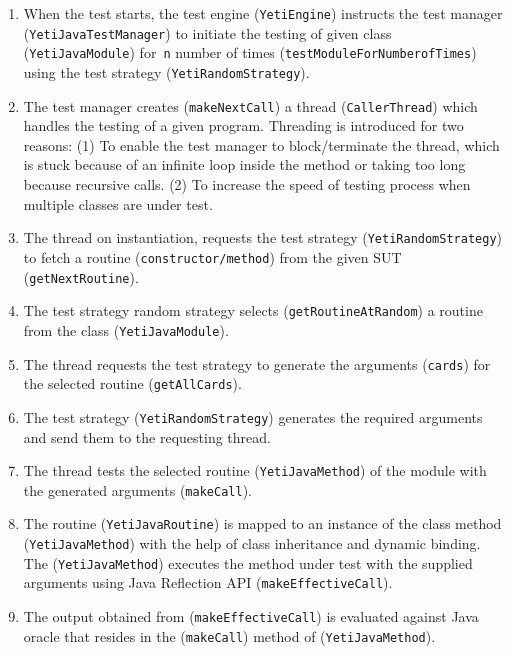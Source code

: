 \begin{enumerate}
\item When the test starts, the test engine (\verb+YetiEngine+) instructs the test manager (\verb+YetiJavaTestManager+) to initiate the testing of given class (\verb+YetiJavaModule+) for~\verb+n+ number of times (\verb+testModuleForNumberofTimes+) using the test strategy (\verb+YetiRandomStrategy+).

\item The test manager creates (\verb+makeNextCall+) a thread (\verb+CallerThread+) which handles the testing of a given program. Threading is introduced for two reasons: (1) To enable the test manager to block/terminate the thread, which is stuck because of an infinite loop inside the method or taking too long because recursive calls. (2) To increase the speed of testing process when multiple classes are under test.

\item The thread on instantiation, requests the test strategy (\verb+YetiRandomStrategy+) to fetch a routine (\verb+constructor/method+) from the given SUT (\verb+getNextRoutine+).

\item The test strategy random strategy selects (\verb+getRoutineAtRandom+) a routine from the class (\verb+YetiJavaModule+).

\item The thread requests the test strategy to generate the arguments (\verb+cards+) for the selected routine (\verb+getAllCards+).

 \item The test strategy (\verb+YetiRandomStrategy+) generates the required arguments and send them to the requesting thread.
 
 \item The thread tests the selected routine (\verb+YetiJavaMethod+) of the module with the generated arguments (\verb+makeCall+).
 
 \item The routine (\verb+YetiJavaRoutine+) is mapped to an instance of the class method (\verb+YetiJavaMethod+) with the help of class inheritance and dynamic binding. The (\verb+YetiJavaMethod+) executes the method under test with the supplied arguments using Java Reflection API (\verb+makeEffectiveCall+).
 
\item The output obtained from (\verb+makeEffectiveCall+) is evaluated against Java oracle that resides in the (\verb+makeCall+) method of (\verb+YetiJavaMethod+).

\end{enumerate}



